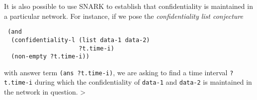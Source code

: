 It is also possible to use SNARK to establish that confidentiality is maintained in a particular network.  
For instance, if we pose the \textit{confidentiality list conjecture}
\begin{verbatim}
 (and
  (confidentiality-l (list data-1 data-2) 
                     ?t.time-i)    
  (non-empty ?t.time-i))
\end{verbatim}
with answer term \verb'(ans ?t.time-i)', we are asking to find a time interval 
\verb'?t.time-i' during which the confidentiality of \verb'data-1' and \verb'data-2' is maintained in the network in question. >
